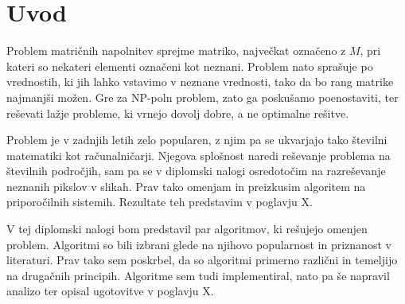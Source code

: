 \chapter{Uvod}
Problem matričnih napolnitev sprejme matriko, največkat označeno z $M$, pri kateri so nekateri elementi označeni kot neznani. Problem nato sprašuje po vrednostih, ki jih lahko vstavimo v neznane vrednosti, tako da bo rang matrike najmanjši možen. Gre za NP-poln problem, zato ga poskušamo poenostaviti, ter reševati lažje probleme, ki vrnejo dovolj dobre, a ne optimalne rešitve. 

Problem je v zadnjih letih zelo popularen, z njim pa se ukvarjajo tako številni matematiki kot računalničarji. Njegova splošnost naredi reševanje problema na številnih področjih, sam pa se v diplomski nalogi osredotočim na razreševanje neznanih pikslov v slikah. Prav tako omenjam in preizkusim algoritem na priporočilnih sistemih. Rezultate teh predstavim v poglavju X.

V tej diplomski nalogi bom predstavil par  algoritmov, ki rešujejo omenjen problem. Algoritmi so bili izbrani glede na njihovo popularnost in priznanost v literaturi. Prav tako sem poskrbel, da so algoritmi primerno različni in temeljijo na drugačnih principih. Algoritme sem tudi implementiral, nato pa še napravil analizo ter opisal ugotovitve v poglavju X. 